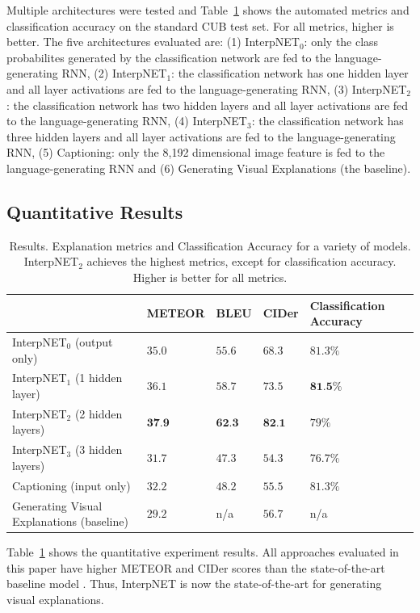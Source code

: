 \documentclass{article}
\begin{document}
Multiple architectures were tested and Table~\ref{tab:results} shows the automated metrics and classification accuracy on the standard CUB test set. For all metrics, higher is better. The five architectures evaluated are: (1) InterpNET$_0$: only the class probabilites generated by the classification network are fed to the language-generating RNN, (2) InterpNET$_1$: the classification network has one hidden layer and all layer activations are fed to the language-generating RNN, (3) InterpNET$_2$: the classification network has two hidden layers and all layer activations are fed to the language-generating RNN, (4) InterpNET$_3$: the classification network has three hidden layers and all layer activations are fed to the language-generating RNN, (5) Captioning: only the 8,192 dimensional image feature is fed to the language-generating RNN and (6) Generating Visual Explanations (the baseline).

\subsection{Quantitative Results}

\begin{table}[t]
  \caption{Results. Explanation metrics and Classification Accuracy for a variety of models. InterpNET$_2$ achieves the highest metrics, except for classification accuracy. Higher is better for all metrics.}
  \label{tab:results}
  \centering
  \begin{tabular}{lllll}
    \toprule
     & METEOR & BLEU & CIDer & Classification Accuracy \\
    \midrule
    InterpNET$_0$ (output only) & $35.0$ & $55.6$ & $68.3$ & $81.3\%$ \\
    InterpNET$_1$ (1 hidden layer) & $36.1$ & $58.7$ & $73.5$ & $\textbf{81.5\%}$ \\
    InterpNET$_2$ (2 hidden layers) & $\textbf{37.9}$ & $\textbf{62.3}$ & $\textbf{82.1}$ & $79\%$ \\
    InterpNET$_3$ (3 hidden layers) & $31.7$ & $47.3$ & $54.3$ & $76.7\%$ \\
    Captioning (input only) & $32.2$ & $48.2$ & $55.5$ & $81.3\%$ \\
    Generating Visual Explanations (baseline) & $29.2$ & n/a & $56.7$ & n/a \\
    \bottomrule
  \end{tabular}
\end{table}

Table~\ref{tab:results} shows the quantitative experiment results. All approaches evaluated in this paper have higher METEOR and CIDer scores than the state-of-the-art baseline model \cite{hendricks2016generating}. Thus, InterpNET is now the state-of-the-art for generating visual explanations.
\end{document}
